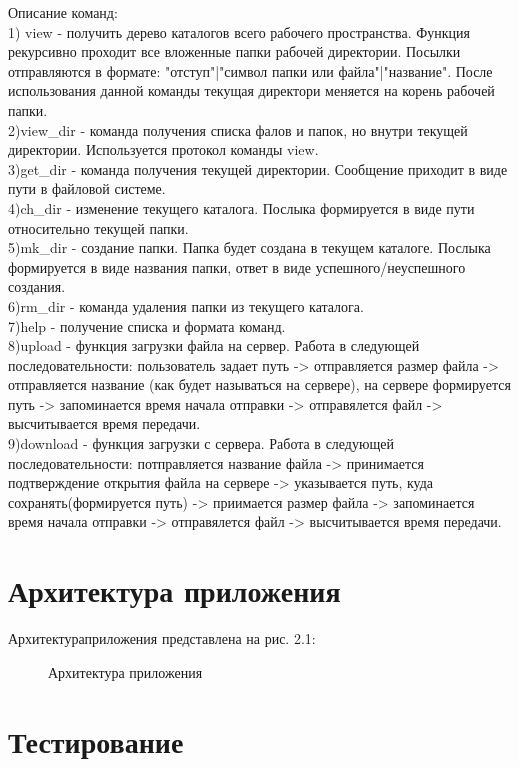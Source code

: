 \documentclass[12pt,a4paper]{report}
\begin{document}
Описание команд:\\
1) view - получить дерево каталогов всего рабочего пространства. Функция рекурсивно проходит все вложенные
папки рабочей директории. Посылки отправляются в формате: "отступ"|"символ папки или файла"|"название". После использования данной команды текущая директори меняется на корень рабочей папки.\\
2)view\_dir - команда получения списка фалов и папок, но внутри текущей директории. Используется протокол команды view.\\
3)get\_dir - команда получения текущей директории. Сообщение приходит в виде пути в файловой системе.\\
4)ch\_dir - изменение текущего каталога. Послыка формируется в виде пути относительно текущей папки.\\
5)mk\_dir - создание папки. Папка будет создана в текущем каталоге. Послыка формируется в виде названия папки, ответ в виде успешного/неуспешного создания.\\
6)rm\_dir - команда удаления папки из текущего каталога. \\
7)help - получение списка и формата команд.\\
8)upload - функция загрузки файла на сервер. Работа в следующей последовательности: пользователь задает путь -> отправляется размер файла -> отправляется название (как будет называться на сервере), на сервере формируется путь -> запоминается время начала отправки -> отправялется файл -> высчитывается время передачи.\\
9)download - функция загрузки с сервера. Работа в следующей последовательности: потправляется название файла -> принимается подтверждение открытия файла на сервере -> указывается путь, куда сохранять(формируется путь) -> приимается размер файла -> запоминается время начала отправки -> отправялется файл -> высчитывается время передачи.\\


\section{Архитектура приложения}
Архитектураприложения представлена на рис. 2.1:
	\begin{figure}[h!]
				\caption{Архитектура приложения}
				\label{img:arch}
			\end{figure}
\section{Тестирование}
\end{document}
